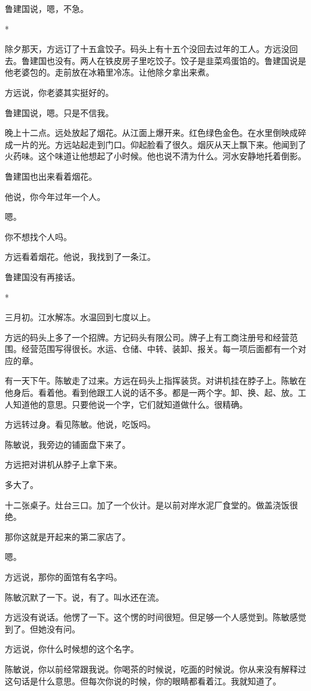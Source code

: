 \documentclass[UTF8,a5paper,11pt,openany]{ctexbook}
\newcommand{\scene}{\vspace{1em}\begin{center}*\quad*\quad*\end{center}\vspace{0.5em}}
\begin{document}
鲁建国说，嗯，不急。


\scene

除夕那天，方远订了十五盒饺子。码头上有十五个没回去过年的工人。方远没回去。鲁建国也没有。两人在铁皮房子里吃饺子。饺子是韭菜鸡蛋馅的。鲁建国说是他老婆包的。走前放在冰箱里冷冻。让他除夕拿出来煮。

方远说，你老婆其实挺好的。

鲁建国说，嗯。只是不信我。

晚上十二点。远处放起了烟花。从江面上爆开来。红色绿色金色。在水里倒映成碎成一片的光。方远站起走到门口。仰起脸看了很久。烟灰从天上飘下来。他闻到了火药味。这个味道让他想起了小时候。他也说不清为什么。河水安静地托着倒影。

鲁建国也出来看着烟花。

他说，你今年过年一个人。

嗯。

你不想找个人吗。

方远看着烟花。他说，我找到了一条江。

鲁建国没有再接话。


\scene

三月初。江水解冻。水温回到七度以上。

方远的码头上多了一个招牌。方记码头有限公司。牌子上有工商注册号和经营范围。经营范围写得很长。水运、仓储、中转、装卸、报关。每一项后面都有一个对应的章。

有一天下午。陈敏走了过来。方远在码头上指挥装货。对讲机挂在脖子上。陈敏在他身后。看着他。看到他跟工人说的话不多。都是一两个字。卸、换、起、放。工人知道他的意思。只要他说一个字，它们就知道做什么。很精确。

方远转过身。看见陈敏。他说，吃饭吗。

陈敏说，我旁边的铺面盘下来了。

方远把对讲机从脖子上拿下来。

多大了。

十二张桌子。灶台三口。加了一个伙计。是以前对岸水泥厂食堂的。做盖浇饭很绝。

那你这就是开起来的第二家店了。

嗯。

方远说，那你的面馆有名字吗。

陈敏沉默了一下。说，有了。叫水还在流。

方远没有说话。他愣了一下。这个愣的时间很短。但足够一个人感觉到。陈敏感觉到了。但她没有问。

方远说，你什么时候想的这个名字。

陈敏说，你以前经常跟我说。你喝茶的时候说，吃面的时候说。你从来没有解释过这句话是什么意思。但每次你说的时候，你的眼睛都看着江。我就知道了。
\end{document}
